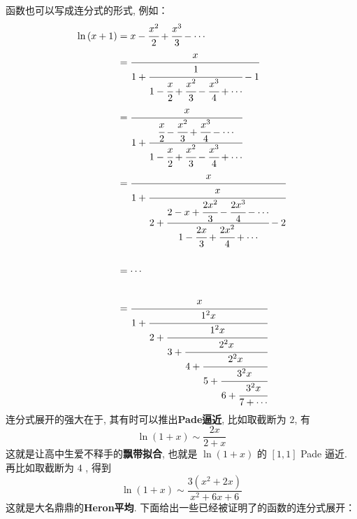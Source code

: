 \documentclass[10pt,a4paper]{book}
\theoremstyle{thmstyle} %
\theoremstyle{defstyle} %
\theoremstyle{prostyle} %
\begin{document}
	函数也可以写成连分式的形式, 例如：
	\begin{align*}
		\ln \left( x+1 \right) &=x-\cfrac{x^2}{2}+\cfrac{x^3}{3}-\cdots 
		\\
		&=\cfrac{x}{1+\cfrac{1}{1-\cfrac{x}{2}+\cfrac{x^2}{3}-\cfrac{x^3}{4}+\cdots}-1}
		\\
		&=\cfrac{x}{1+\cfrac{\cfrac{x}{2}-\cfrac{x^2}{3}+\cfrac{x^3}{4}-\cdots}{1-\cfrac{x}{2}+\cfrac{x^2}{3}-\cfrac{x^3}{4}+\cdots}}
		\\
		&=\cfrac{x}{1+\cfrac{x}{2+\cfrac{2-x+\cfrac{2x^2}{3}-\cfrac{2x^3}{4}-\cdots}{1-\cfrac{2x}{3}+\cfrac{2x^2}{4}+\cdots}-2}}\\\\
		&=\dotsb\\\\
	    &=\cfrac{x}{1+\cfrac{1^2x}{2+\cfrac{1^2x}{3+\cfrac{2^2x}{4+\cfrac{2^2x}{5+\cfrac{3^2x}{6+\cfrac{3^2x}{7+\cdots}}}}}}}
	\end{align*}
	连分式展开的强大在于, 其有时可以推出\textbf{\thinspace Pade\thinspace 逼近}, 比如取截断为 $2$, 有
	$$
	\ln \left( 1+x \right) \sim \frac{2x}{2+x}
	$$
	这就是让高中生爱不释手的\textbf{飘带拟合}, 也就是 $\ln(1+x)$ 的 $[1,1]$ Pade 逼近. 再比如取截断为 $4$ , 得到
	$$
	\ln \left( 1+x \right) \sim \frac{3\left( x^2+2x \right)}{x^2+6x+6}
	$$
	这就是大名鼎鼎的\textbf{\thinspace Heron\thinspace 平均}.
	下面给出一些已经被证明了的函数的连分式展开：
\end{document}
